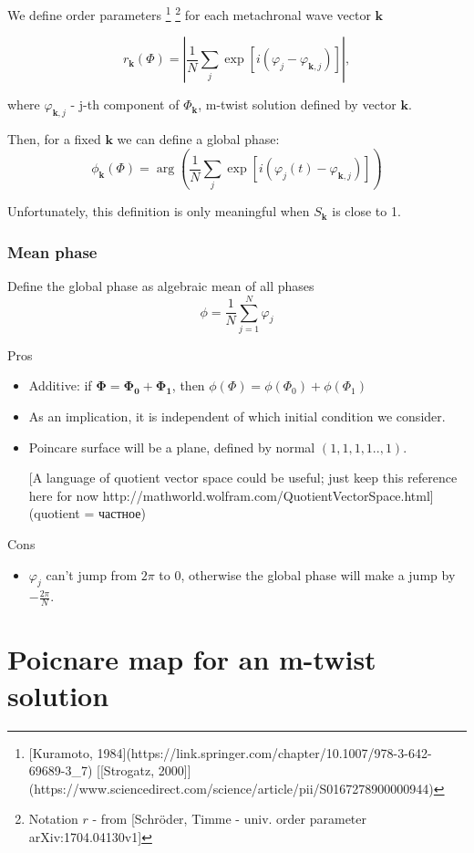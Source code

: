 \documentclass[a4paper,10pt]{article}
\renewcommand*{\vec}[1]{\mathbf{#1}}
\newcommand*{\F}{\Phi} %
\begin{document}
We define order parameters
\footnote{[Kuramoto, 1984](https://link.springer.com/chapter/10.1007/978-3-642-69689-3\_7)  [[Strogatz, 2000]](https://www.sciencedirect.com/science/article/pii/S0167278900000944)}
\footnote{Notation $r$ - from [Schröder, Timme - univ. order parameter arXiv:1704.04130v1]}
for each metachronal wave vector $\mathbf{k}$

$$r_\vec{k}(\F) = \left| \frac{1}{N}\sum_j \exp\left[ i ( \varphi_j - \varphi_{\vec{k},j} ) \right] \right|,$$

where $\varphi_{\vec{k},j}$ - j-th component of $\Phi_\vec{k}$, m-twist solution defined by vector $\vec{k}$.

Then, for a fixed $\vec{k}$ we can define a global phase:
$$\phi_{\vec{k}}(\F) = \arg \left( \frac{1}{N}\sum_j \exp\left[ i ( \varphi_j(t) - \varphi_{\vec{k},j} ) \right] \right) $$

Unfortunately, this definition is only meaningful when $S_\vec{k}$ is close to 1.

\subsubsection{Mean phase}

Define the global phase as algebraic mean of all phases
$$
\phi =  \frac{1}{N}\sum_{j=1}^{N} \varphi_j
$$

Pros
\begin{itemize}

\item Additive: if $\mathbf{\Phi} = \mathbf{\F_0}+ \mathbf{\F_1} $, then $\phi(\F) = \phi(\F_0) + \phi(\F_1)$
\item As an implication, it is independent of which initial condition we consider.
\item Poincare surface will be a plane, defined by normal $(1,1,1,1..,1)$.

  [A language of quotient vector space could be useful; just keep this reference here for now http://mathworld.wolfram.com/QuotientVectorSpace.html]
  (quotient = частное)

\end{itemize}

Cons
\begin{itemize}
\item $\varphi_j$ can't jump from  $2 \pi$ to $0$, otherwise the global phase will make a jump by $- \frac{2 \pi}{N}$.
\end{itemize}


\section{Poicnare map for an m-twist solution}
\end{document}
